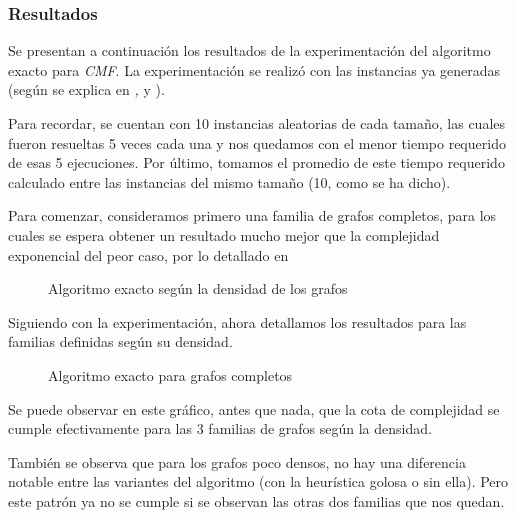\subsubsection{Resultados}
\par Se presentan a continuaci\'on los resultados de la experimentaci\'on
    del algoritmo exacto para \emph{CMF}. La experimentaci\'on se realiz\'o
    con las instancias ya generadas (seg\'un se explica en \emph{,
    } y \emph{}).

\par Para recordar, se cuentan con 10 instancias aleatorias de cada tama\~no,
    las cuales fueron resueltas 5 veces cada una y nos quedamos con el menor tiempo
    requerido de esas 5 ejecuciones. Por \'ultimo, tomamos el promedio de este tiempo
    requerido calculado entre las instancias del mismo tama\~no (10, como se ha
    dicho).

\bigskip

\par Para comenzar, consideramos primero una familia de grafos completos, para
    los cuales se espera obtener un resultado mucho mejor que la complejidad
    exponencial del peor caso, por lo detallado en \emph{}

\begin{figure}[H]
    \centering
    \fontsize{8}{10}\selectfont
    \resizebox{0.8\textwidth}{!}{}
    \caption{Algoritmo exacto seg\'un la densidad de los grafos}
\end{figure}

\bigskip

\par Siguiendo con la experimentaci\'on, ahora detallamos los resultados para las
    familias definidas seg\'un su densidad.

\begin{figure}[H]
    \centering
    \fontsize{8}{10}\selectfont
    \resizebox{1.0\textwidth}{!}{}
    \caption{Algoritmo exacto para grafos completos}
\end{figure}

\par Se puede observar en este gr\'afico, antes que nada, que la cota de complejidad
    se cumple efectivamente para las 3 familias de grafos seg\'un la densidad.

\par Tambi\'en se observa que para los grafos poco densos, no hay una diferencia
    notable entre las variantes del algoritmo (con la heur\'istica golosa o sin
    ella). Pero este patr\'on ya no se cumple si se observan las otras dos familias
    que nos quedan.


